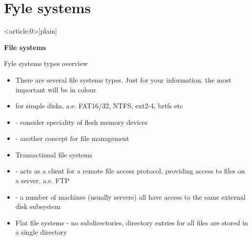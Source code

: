 \documentclass[usenames,dvipsnames,10pt,aspectratio=169]{beamer}
\begin{document}
\section{Fyle systems}
{ %
    \begin{frame}<article:0>[plain]
        \hspace{4cm}\Huge\textbf{File systems}
    \end{frame}
}

\begin{frame}{Fyle systems types overview}
    \begin{itemize}
        \item There are several file systems types. Just for your information. the most important will be in  colour
        \item{} for simple disks, a.e. FAT16/32, NTFS, ext2-4, brtfs etc
        \item{} - consider speciality of flesh memory devices
        \item{} - another concept for file management
        \item Transactional file systems
        \item{} - acts as a client for a remote file access protocol, providing access to files on a server, a.e. FTP
        \item{} - a number of machines (usually servers) all have access to the same external disk subsystem
        \item Flat file systems - no subdirectories, directory entries for all files are stored in a single directory
    \end{itemize}
\end{frame}
\end{document}
